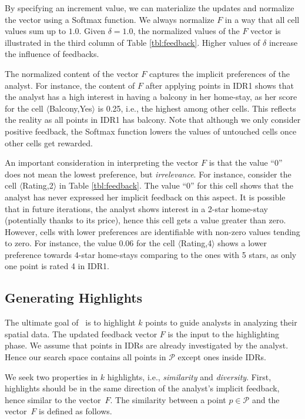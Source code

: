 \vspace{2pt}
By specifying an increment value, we can materialize the updates and normalize the vector using a Softmax function. We always normalize $F$ in a way that all cell values sum up to $1.0$. Given $\delta = 1.0$, the normalized values of the $F$ vector is illustrated in the third column of Table \ref{tbl:feedback}. Higher values of $\delta$ increase the influence of feedbacks.

\vspace{2pt}
The normalized content of the vector $F$ captures the implicit preferences of the analyst. For instance, the content of $F$ after applying points in IDR1 shows that the analyst has a high interest in having a balcony in her home-stay, as her score for the cell $\langle$Balcony,Yes$\rangle$ is 0.25, i.e., the highest among other cells. This reflects the reality as all points in IDR1 has balcony. Note that although we only consider positive feedback, the Softmax function lowers the values of untouched cells once other cells get rewarded.

\vspace{2pt}
An important consideration in interpreting the vector $F$ is that the value ``0'' does not mean the lowest preference, but {\em irrelevance}. For instance, consider the cell $\langle$Rating,2$\rangle$ in Table \ref{tbl:feedback}. The value ``0'' for this cell shows that the analyst has never expressed her implicit feedback on this aspect. It is possible that in future iterations, the analyst shows interest in a 2-star home-stay (potentially thanks to its price), hence this cell gets a value greater than zero. However, cells with lower preferences are identifiable with non-zero values tending to zero. For instance, the value 0.06 for the cell $\langle$Rating,4$\rangle$ shows a lower preference towards 4-star home-stays comparing to the ones with 5 stars, as only one point is rated 4 in IDR1.

\subsection{Generating Highlights}
The ultimate goal of \sgg\ is to highlight $k$ points to guide analysts in analyzing their spatial data. The updated feedback vector $F$ is the input to the highlighting phase. We assume that points in IDRs are already investigated by the analyst. Hence our search space contains all points in $\mathcal{P}$ except ones inside IDRs.

\vspace{2pt}
We seek two properties in $k$ highlights, i.e., {\em similarity} and {\em diversity}. First, highlights should be in the same direction of the analyst's implicit feedback, hence similar to the vector~$F$. The similarity between a point $p \in \mathcal{P}$ and the vector~$F$ is defined as follows.

